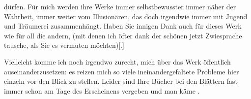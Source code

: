                dürfen. Für mich werden ihre Werke immer selbstbewusster immer näher der Wahrheit,
               immer weiter vom Illusionären, das doch irgendwie immer mit Jugend und Träumerei
               zusammenhängt. Haben Sie innigen Dank auch für dieses Werk wie für all die an{\pb}dern, (mit denen ich öfter dank der
               schönen \label{T_L03641-1v}\label{T_L03641-1} jetzt Zwiesprache tausche, als Sie es vermuten möchten){[}.{]}\pend
           
\pstart
           Vielleicht komme ich noch irgendwo zurecht, mich über das Werk öffentlich auseinanderzusetzen: es
               reizen mich so viele ineinandergefaltete Probleme hier einzeln vor den Blick zu
               stellen. Leider sind Ihre Bücher bei den Blättern fast immer schon am Tage des
               Erscheinens vergeben und man käme \label{K_L03641-2v}\label{K_L03641-2}.\pend
           
